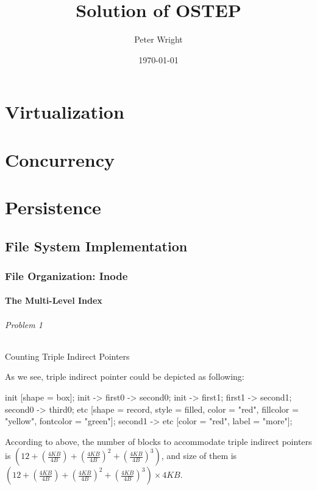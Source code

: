 \documentclass{report}
\title{Solution of OSTEP}
\author{Peter Wright}
\date{\today}
\begin{document}
\maketitle
\tableofcontents
\part{Virtualization}
\part{Concurrency}
\part{Persistence}
\chapter{File System Implementation}
\section{File Organization: Inode}
\subsection{The Multi-Level Index}
\paragraph{Problem 1} Counting Triple Indirect Pointers 
\par
As we see, triple indirect pointer could be depicted as following:
\par
{} {
    init [shape = box];
    init -> first0 -> second0;
    init -> first1;
    first1 -> second1;
    second0 -> third0;
    etc [shape = record, style = filled, color = "red", fillcolor = "yellow", fontcolor = "green"];
    second1 -> etc [color = "red", label = "more"];    
}
\par

According to above, the number of blocks to accommodate triple indirect pointers is $(12 + (\frac{4 KB}{4 B}) + (\frac{4 KB}{4 B})^2 + (\frac{4 KB}{4 B})^3)$, and size of them is $(12 + (\frac{4 KB}{4 B}) + (\frac{4 KB}{4 B})^2 + (\frac{4 KB}{4 B})^3) \times 4 KB$.

                
\end{document}
